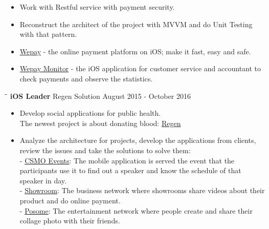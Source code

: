 \documentclass[margin, 10pt]{res}
\begin{document}
\begin{resume}
   \begin{itemize}
		\item Work with Restful service with payment security.
		\item Reconstruct the architect of the project with MVVM and do Unit Testing with that pattern.  
		\item {\color{blue}\href{https://itunes.apple.com/au/app/vi-wepay/id1116328276?mt=8}{Wepay}} - the online payment platform on iOS; make it fast, easy and safe.
		\item {\color{blue}\href{}{Wepay Monitor}} - the iOS application for customer service and accountant to check payments and observe the statistics. 
   \end{itemize}
   
   \begin{tabbing}
   \hspace{2.0in}\= \hspace{2.0in}\= \kill %
   {\bf iOS Leader} \>Regen Solution \>August 2015 - October 2016\\
   \end{tabbing}\vspace{-20pt} %

   \begin{itemize}
   		\item Develop social applications for public health. \\ The newest project is about donating blood: {\color{blue}\href{https://itunes.apple.com/us/app/id1068139116}{Regen}}
		\item Analyze the architecture for projects, develop the applications from clients, review the issues and take the solutions to solve them:\\ - {\color{blue}\href{https://itunes.apple.com/us/app/csmo-events/id1152856867?ls=1&mt=8}{CSMO Events}}: The mobile application is served the event that the participants use it to find out a speaker and know the schedule of that speaker in day. \\ - {\color{blue}\href{https://itunes.apple.com/US/app/id787053829?mt=8}{Showroom}}: The business network where showrooms share videos about their product and do online payment.\\ - {\color{blue}\href{https://itunes.apple.com/kh/app/posome-long-distance-zero-gap/id1097859447?mt=8}{Posome}}: The entertainment network where people create and share their collage photo with their friends.
   \end{itemize}


\end{resume}
\end{document}
